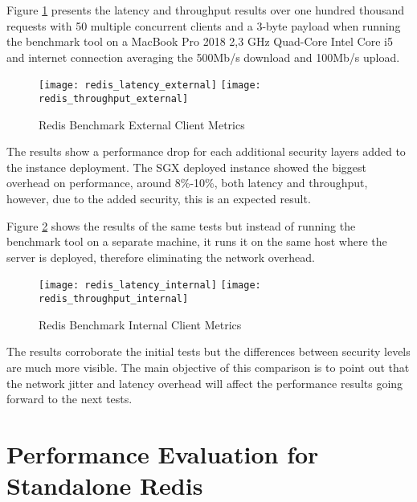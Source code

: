 Figure \ref{fig:redis_benchmark_external_metrics} presents the latency and throughput results over one hundred thousand requests with 50 multiple concurrent clients and a 3-byte payload when running the benchmark tool on a MacBook Pro 2018 2,3 GHz Quad-Core Intel Core i5 and internet connection averaging the 500Mb/s download and 100Mb/s upload.

\begin{figure}[htbp]
  \centering
    {\texttt{[image: redis\_latency\_external]}}%
    {\texttt{[image: redis\_throughput\_external]}}%
  \caption{Redis Benchmark External Client Metrics}
  \label{fig:redis_benchmark_external_metrics}
\end{figure}

The results show a performance drop for each additional security layers added to the instance deployment. The \gls{SGX} deployed instance showed the biggest overhead on performance, around 8\%-10\%, both latency and throughput, however, due to the added security, this is an expected result.

Figure \ref{fig:redis_benchmark_internal_metrics} shows the results of the same tests but instead of running the benchmark tool on a separate machine, it runs it on the same host where the server is deployed, therefore eliminating the network overhead.

\begin{figure}[htbp]
  \centering
    {\texttt{[image: redis\_latency\_internal]}}%
    {\texttt{[image: redis\_throughput\_internal]}}%
  \caption{Redis Benchmark Internal Client Metrics}
  \label{fig:redis_benchmark_internal_metrics}
\end{figure}

The results corroborate the initial tests but the differences between security levels are much more visible. The main objective of this comparison is to point out that the network jitter and latency overhead will affect the performance results going forward to the next tests.

\section{Performance Evaluation for Standalone Redis}
\label{sec:performance_evaluation_standalone_redis}

